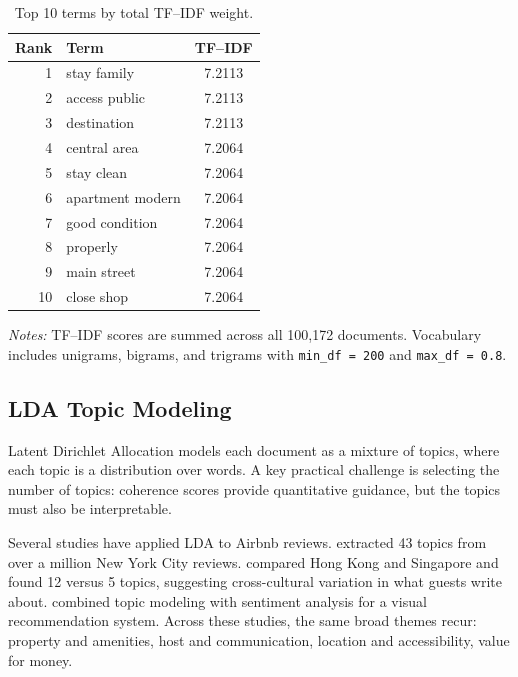 \documentclass[11pt]{article}
\begin{document}
\begin{table}[H]
\centering
\begin{threeparttable}
\caption{Top 10 terms by total TF--IDF weight.}
\label{tab:tfidf}
\begin{tabular}{@{}rlS[table-format=1.4]@{}}
\toprule
{Rank} & {Term} & {TF--IDF} \\
  & stay family      & 7.2113 \\
2  & access public    & 7.2113 \\
3  & destination      & 7.2113 \\
4  & central area     & 7.2064 \\
5  & stay clean       & 7.2064 \\
6  & apartment modern & 7.2064 \\
7  & good condition   & 7.2064 \\
8  & properly         & 7.2064 \\
9  & main street      & 7.2064 \\
10 & close shop       & 7.2064 \\
\bottomrule
\end{tabular}
\begin{tablenotes}\footnotesize
\item \textit{Notes:} TF--IDF scores are summed across all 100,172 documents. Vocabulary includes unigrams, bigrams, and trigrams with \texttt{min\_df\,=\,200} and \texttt{max\_df\,=\,0.8}.
\end{tablenotes}
\end{threeparttable}
\end{table}

\subsection{LDA Topic Modeling}
Latent Dirichlet Allocation \citep{blei2003latent} models each document as a mixture of topics, where each topic is a distribution over words. A key practical challenge is selecting the number of topics: coherence scores \citep{roder2015exploring} provide quantitative guidance, but the topics must also be interpretable.

Several studies have applied LDA to Airbnb reviews. \citet{jang2020determinants} extracted 43 topics from over a million New York City reviews. \citet{chong2020comparative} compared Hong Kong and Singapore and found 12 versus 5 topics, suggesting cross-cultural variation in what guests write about. \citet{luo2022visual} combined topic modeling with sentiment analysis for a visual recommendation system. Across these studies, the same broad themes recur: property and amenities, host and communication, location and accessibility, value for money.
\end{document}
